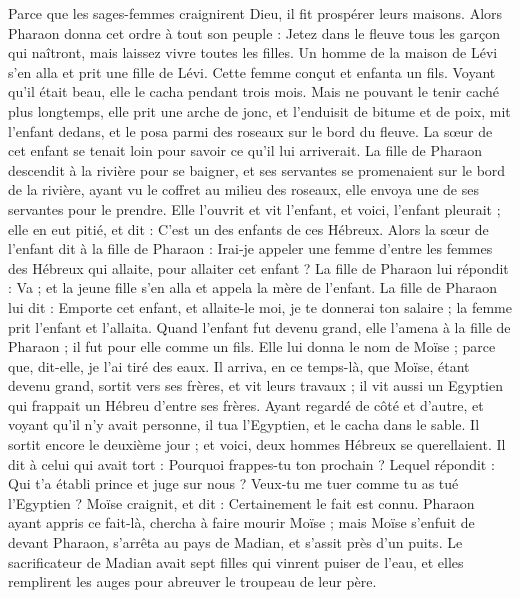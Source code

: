 \begin{multicols}{2}
Parce que les sages-femmes craignirent Dieu, il fit prospérer leurs maisons.
Alors Pharaon donna cet ordre à tout son peuple : Jetez dans le fleuve tous les garçon qui naîtront, mais laissez vivre toutes les filles.
\VerseOne{}Un homme de la maison de Lévi s'en alla et prit une fille de Lévi.
Cette femme conçut et enfanta un fils. Voyant qu'il était beau, elle le cacha pendant trois mois.
Mais ne pouvant le tenir caché plus longtemps, elle prit une arche de jonc, et l'enduisit de bitume et de poix, mit l'enfant dedans, et le posa parmi des roseaux sur le bord du fleuve.
La sœur de cet enfant se tenait loin pour savoir ce qu'il lui arriverait.
La fille de Pharaon descendit à la rivière pour se baigner, et ses servantes se promenaient sur le bord de la rivière, ayant vu le coffret au milieu des roseaux, elle envoya une de ses servantes pour le prendre.
Elle l’ouvrit et vit l'enfant, et voici, l'enfant pleurait ; elle en eut pitié, et dit : C'est un des enfants de ces Hébreux.
Alors la sœur de l'enfant dit à la fille de Pharaon : Irai-je appeler une femme d'entre les femmes des Hébreux qui allaite, pour allaiter cet enfant ?
La fille de Pharaon lui répondit : Va ; et la jeune fille s'en alla et appela la mère de l'enfant.
La fille de Pharaon lui dit : Emporte cet enfant, et allaite-le moi, je te donnerai ton salaire ; la femme prit l'enfant et l'allaita.
Quand l'enfant fut devenu grand, elle l'amena à la fille de Pharaon ; il fut pour elle comme un fils. Elle lui donna le nom de Moïse ; parce que, dit-elle, je l'ai tiré des eaux.
Il arriva, en ce temps-là, que Moïse, étant devenu grand, sortit vers ses frères, et vit leurs travaux ; il vit aussi un Egyptien qui frappait un Hébreu d'entre ses frères.
Ayant regardé de côté et d’autre, et voyant qu'il n'y avait personne, il tua l'Egyptien, et le cacha dans le sable.
Il sortit encore le deuxième jour ; et voici, deux hommes Hébreux se querellaient. Il dit à celui qui avait tort : Pourquoi frappes-tu ton prochain ?
Lequel répondit : Qui t'a établi prince et juge sur nous ? Veux-tu me tuer comme tu as tué l'Egyptien ? Moïse craignit, et dit : Certainement le fait est connu.
Pharaon ayant appris ce fait-là, chercha à faire mourir Moïse ; mais Moïse s'enfuit de devant Pharaon, s'arrêta au pays de Madian, et s'assit près d'un puits.
Le sacrificateur de Madian avait sept filles qui vinrent puiser de l'eau, et elles remplirent les auges pour abreuver le troupeau de leur père.

\end{multicols}
